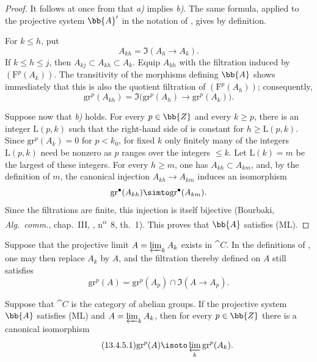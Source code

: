 \begin{proof}
It follows at once from  that \emph{a)} implies
\emph{b)}. The same formula, applied to the projective system
$\bb{A}'$ in the notation of , gives
 by definition.

For $k\leq h$, put
\[
  A_{kh}=\Im(A_h\longrightarrow A_k).
\]
If $k\leq h\leq j$, then
$A_{kj}\subset A_{kh}\subset A_k$.
Equip $A_{kh}$ with the filtration induced by
$(\mathrm{F}^p(A_k))$.
The transitivity of the morphisms defining $\bb{A}$ shows
immediately that this is also the quotient filtration of
$(\mathrm{F}^p(A_h))$; consequently,
\begin{equation}
\label{0.13.4.3.2}
\tag{13.4.3.2}
  \mathrm{gr}^p(A_{kh})
  =
  \Im\bigl(
    \mathrm{gr}^p(A_h)\longrightarrow\mathrm{gr}^p(A_k)
  \bigr).
\end{equation}

Suppose now that \emph{b)} holds.
For every $p\in\bb{Z}$ and every $k\geq p$, there is an integer
$\mathrm{L}(p,k)$ such that the right-hand side of
 is constant for $h\geq\mathrm{L}(p,k)$.
Since $\mathrm{gr}^p(A_k)=0$ for $p<k_0$, for fixed $k$ only
finitely many of the integers $\mathrm{L}(p,k)$ need be nonzero as
$p$ ranges over the integers $\leq k$.
Let $\mathrm{L}(k)=m$ be the largest of these integers.
For every $h\geq m$, one has
$A_{kh}\subset A_{km}$, and, by the definition of $m$, the canonical
injection
$A_{kh}\longrightarrow A_{km}$ induces an isomorphism
\[
  \mathrm{gr}^\bullet(A_{kh})
  \simto
  \mathrm{gr}^\bullet(A_{km}).
\]
Since the filtrations are finite, this injection is itself bijective
(Bourbaki, \emph{Alg.\ comm.}, chap.~III, ,
n\textsuperscript{o}~8, th.~1).
This proves that $\bb{A}$ satisfies (ML).
\end{proof}

\begin{env}[13.4.4]
\label{0.13.4.4}
Suppose that the projective limit
$A=\varprojlim_k A_k$ exists in $\cat{C}$.
In the definitions of , one may then replace $A_k$ by
$A$, and the filtration thereby defined on $A$ still satisfies
\begin{equation}
\label{0.13.4.4.1}
\tag{13.4.4.1}
  \mathrm{gr}^p(A)
  =
  \mathrm{gr}^p(A_p)
  \cap
  \Im(A\longrightarrow A_p).
\end{equation}
\end{env}

\begin{corollary}[13.4.5]
\label{0.13.4.5}
Suppose that $\cat{C}$ is the category of abelian groups.
If the projective system $\bb{A}$ satisfies (ML) and
$A=\varprojlim_k A_k$, then for every $p\in\bb{Z}$ there is a
canonical isomorphism
\begin{equation}
\label{0.13.4.5.1}
\tag{13.4.5.1}
  \mathrm{gr}^p(A)
  \isoto
  \varprojlim_k\mathrm{gr}^p(A_k).
\end{equation}
\end{corollary}

